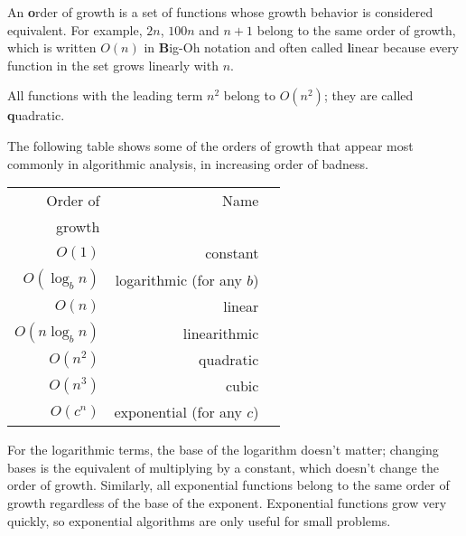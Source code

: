 \documentclass[
DIV=11,
fontsize=12,
twoside,
headinclude=false,
titlepage=firstiscover,
abstract=true,
headsepline=true,
footsepline=true,
chapterprefix=true, %
headings=big,
bibliography=totoc,%
captions=tableheading
]{scrbook}
\theoremstyle{definition}
\begin{document}
An {\textbf order of growth} is a set of functions whose growth
behavior is considered equivalent.  For example, $2n$, $100n$ and $n+1$ 
belong to the same order of growth, which is written $O(n)$ in
{\textbf Big-Oh notation} and often called {\textbf linear} because every function
in the set grows linearly with $n$.

All functions with the leading term $n^2$ belong to $O(n^2)$; they are
called {\textbf quadratic}.

The following table shows some of the orders of growth that
appear most commonly in algorithmic analysis,
in increasing order of badness.

\begin{tabular}{|r|r|r|}
\hline
Order of     &   Name      \\
growth       &               \\
\hline
$O(1)$             & constant \\
$O(\log_b n)$      & logarithmic (for any $b$) \\
$O(n)$             & linear \\
$O(n \log_b n)$    & linearithmic \\
$O(n^2)$           & quadratic     \\
$O(n^3)$           & cubic     \\
$O(c^n)$           & exponential (for any $c$)    \\
\hline
\end{tabular}

For the logarithmic terms, the base of the logarithm doesn't matter;
changing bases is the equivalent of multiplying by a constant, which
doesn't change the order of growth.  Similarly, all exponential
functions belong to the same order of growth regardless of the base of
the exponent.
Exponential functions grow very quickly, so exponential algorithms are
only useful for small problems.
\end{document}
